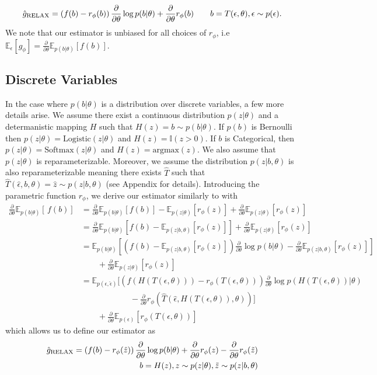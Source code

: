\documentclass{article}
\newcommand{\discreteDist}{p(b|\theta)}
\newcommand{\loss}{f(b)}
\newcommand{\expectedLoss}{\mathbb{E}_{\discreteDist{}} \! \left[ \, \loss{} \right]}
\newcommand{\E}{\mathbb{E}}
\newcommand{\PT}{\frac{\partial}{\partial \theta}}
\begin{document}
\begin{align}
\label{eq:cont_est}
\hat g_\textnormal{RELAX} = \left(f(b) -r_\phi(b)\right)\PT \log p(b|\theta) + \PT r_\phi(b) \qquad b = T(\epsilon, \theta), \epsilon \sim p(\epsilon).
\end{align}
We note that our estimator is unbiased for all choices of $r_\phi$, i.e $\E_\epsilon[g_\phi] = \PT\E_{p(b|\theta)}[f(b)]$. 

\subsection{Discrete Variables}
In the case where $p(b|\theta)$ is a distribution over discrete variables, a few more details arise. We assume there exist a continuous distribution $p(z|\theta)$ and a determanistic mapping $H$ such that $H(z) = b \sim p(b|\theta)$. If $p(b)$ is Bernoulli then $p(z|\theta) = \text{Logistic}(z|\theta)$ and $H(z) = \mathbb{I}(z>0)$. If $b$ is Categorical, then $p(z|\theta) = \text{Softmax}(z|\theta)$ and $H(z) = \text{argmax}(z)$. We also assume that $p(z|\theta)$ is reparameterizable. Moreover, we assume the distribution $p(z|b, \theta)$ is also reparameterizable meaning there exists $\hat{T}$ such that $\hat{T}(\hat{\epsilon}, b, \theta) = \hat{z} \sim p(z|b, \theta)$ (see Appendix for details). Introducing the parametric function $r_\phi$, we derive our estimator similarly to \cite{tucker2017rebar} with
\begin{align}
\PT \expectedLoss{} &= \PT \E_{p(b|\theta)}\left[ f(b) \right] - \E_{p(z|\theta)}\left[ r_\phi(z) \right] + \PT\E_{p(z|\theta)}\left[ r_\phi(z) \right]\nonumber\\
&= \PT \E_{p(b|\theta)}\left[ f(b) - \E_{p(z|b, \theta)}\left[ r_\phi(z) \right]  \right] + \PT\E_{p(z|\theta)}\left[ r_\phi(z) \right]\nonumber\\
&= \E_{p(b|\theta)}\left[\left( f(b) - \E_{p(z|b, \theta)}\left[r_\phi(z) \right] \right)\PT \log p(b|\theta)  - \PT \E_{p(z|b, \theta)}\left[r_\phi(z) \right] \right]\nonumber\\
&\qquad + \PT\E_{p(z|\theta)}\left[ r_\phi(z) \right]\nonumber\\
&= \E_{p(\epsilon, \hat{\epsilon})}\Big[\left( f(H(T(\epsilon, \theta))) - r_\phi(T(\epsilon, \theta))  \right) \PT \log p(H(T(\epsilon, \theta))|\theta) \nonumber\\
&\qquad\qquad\qquad - \PT r_\phi(\hat{T}(\hat{\epsilon}, H(T(\epsilon, \theta)), \theta)) \Big]\nonumber\\
&\qquad + \PT\E_{p(\epsilon)}\left[ r_\phi(T(\epsilon, \theta)) \right]\nonumber
\end{align}
which allows us to define our estimator as
\begin{align}
\hat g_\textnormal{RELAX} = \left(f(b) -r_\phi(\hat{z})\right)\PT \log p(b|\theta) + \PT r_\phi(z) - \PT r_\phi (\tilde{z})\nonumber\\
\qquad b = H(z), z \sim p(z|\theta), \tilde{z} \sim p(z|b, \theta)
\end{align}
\end{document}
